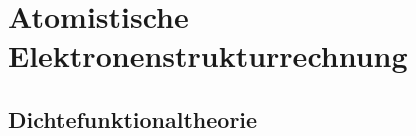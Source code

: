 \section{Atomistische Elektronenstrukturrechnung}
\label{cha:atomistischeelektronenstrukturrechnung}

\subsection{Dichtefunktionaltheorie}
\label{cha:dichtefunktionaltheorie}
